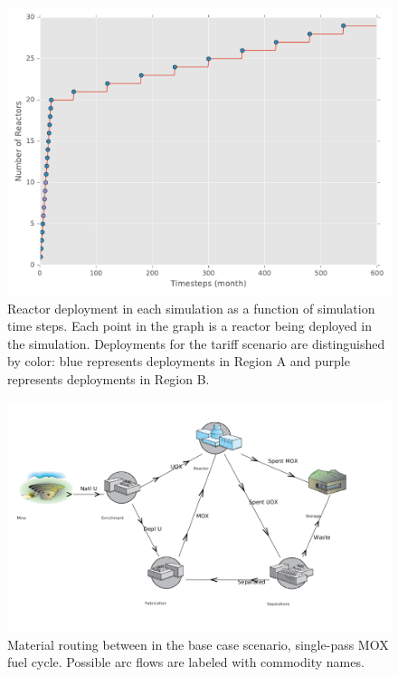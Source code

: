 \begin{figure}
  \begin{center}
    \includegraphics[width=\columnwidth]{rxtr_deploy.pdf}
    \caption[]{
      \label{fig:deploy}
      Reactor deployment in each simulation as a function of simulation time
      steps. Each point in the graph is a reactor being deployed in the
      simulation. Deployments for the tariff scenario are distinguished by
      color: blue represents deployments in Region A and purple represents
      deployments in Region B.}
  \end{center}
\end{figure}

\begin{figure}
  \begin{center}
    \includegraphics[width=\columnwidth]{base_case_fc}
    \caption[]{
      \label{fig:base}
      Material routing between in the base case scenario, single-pass MOX fuel
      cycle. Possible arc flows are labeled with commodity names.}
  \end{center}
\end{figure}

